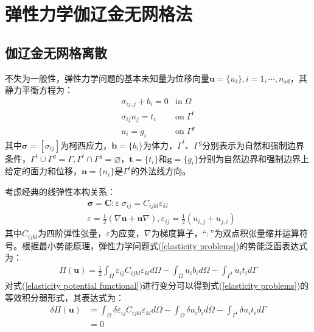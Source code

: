 \chapter{弹性力学伽辽金无网格法}
\section{伽辽金无网格离散}
不失为一般性，弹性力学问题的基本未知量为位移向量$\pmb{u}=\{u_i\},i=1,\dotsb,n_{sd}$，其静力平衡方程为：
\begin{equation}\label{elasticity problems}
\begin{split}
    \sigma_{ij,j}+b_i=0&\text{in}\;\Omega\\
    \sigma_{ij}n_j=t_i&\text{on}\;\Gamma^t\\
    u_i=g_i&\text{on}\;\Gamma^g
\end{split}
\end{equation}
其中$\pmb \sigma=[\sigma_{ij}]$为柯西应力，$\pmb{b}=\{b_i\}$为体力，$\Gamma^t \text{、}\Gamma^g$分别表示为自然和强制边界条件，$\Gamma^t\cup \Gamma^g=\Gamma,\Gamma^t\cap \Gamma^g=\varnothing$，$\pmb{t}=\{t_i\}$和$\pmb{g}=\{g_i\}$分别为自然边界和强制边界上给定的面力和位移，$\pmb{n}=\{n_i\}$是$\Gamma^{t}$的外法线方向。\par
考虑经典的线弹性本构关系：
\begin{equation}\label{constitutive relation}
\begin{split}
        &\pmb{\sigma}=\pmb{C}\pmb{:}\varepsilon\;\sigma_{ij}=C_{ijkl}\varepsilon_{kl}\\
        &\varepsilon=\frac{1}{2}(\nabla \pmb{u}+\pmb{u}\nabla),\varepsilon_{ij}=\frac{1}{2}(u_{i,j}+u_{j,i})
\end{split}
\end{equation}
其中$C_{ijkl}$为四阶弹性张量，$\varepsilon$为应变，$\nabla$为梯度算子，“$\pmb{:}$”为双点积张量缩并运算符号。根据最小势能原理，弹性力学问题式(\ref{elasticity problems})的势能泛函表达式为：
\begin{equation}\label{elasticity potential functional}
\begin{split}
    \Pi(\pmb{u})=\frac{1}{2}\int_{\Omega}\varepsilon_{ij}C_{ijkl}\varepsilon_{kl}d\Omega-\int_{\Omega}u_ib_id\Omega-\int_{\Gamma^t}u_it_id\Gamma
\end{split}
\end{equation}
对式(\ref{elasticity potential functional})进行变分可以得到式(\ref{elasticity problems})的等效积分弱形式，其表达式为：
\begin{equation}\label{elasticity weak form}
\begin{split}
    \delta\Pi(\pmb{u})&=\int_{\Omega}\delta\varepsilon_{ij}C_{ijkl}\varepsilon_{kl}d\Omega-\int_{\Omega}\delta u_ib_id\Omega-\int_{\Gamma^t}\delta u_it_id\Gamma\\
   &=0
\end{split}
\end{equation}\par
